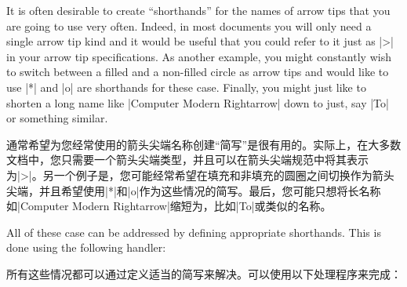 It is often desirable to create ``shorthands'' for the names of arrow tips that
you are going to use very often. Indeed, in most documents you will only need a
single arrow tip kind and it would be useful that you could refer to it just as
|>| in your arrow tip specifications. As another example, you might constantly
wish to switch between a filled and a non-filled circle as arrow tips and would
like to use |*| and |o| are shorthands for these case. Finally, you might just
like to shorten a long name like |Computer Modern Rightarrow| down to just, say
|To| or something similar.

通常希望为您经常使用的箭头尖端名称创建“简写”是很有用的。实际上，在大多数文档中，您只需要一个箭头尖端类型，并且可以在箭头尖端规范中将其表示为|>|。另一个例子是，您可能经常希望在填充和非填充的圆圈之间切换作为箭头尖端，并且希望使用|*|和|o|作为这些情况的简写。最后，您可能只想将长名称如|Computer Modern Rightarrow|缩短为，比如|To|或类似的名称。

All of these case can be addressed by defining appropriate shorthands. This is
done using the following handler:

所有这些情况都可以通过定义适当的简写来解决。可以使用以下处理程序来完成：

